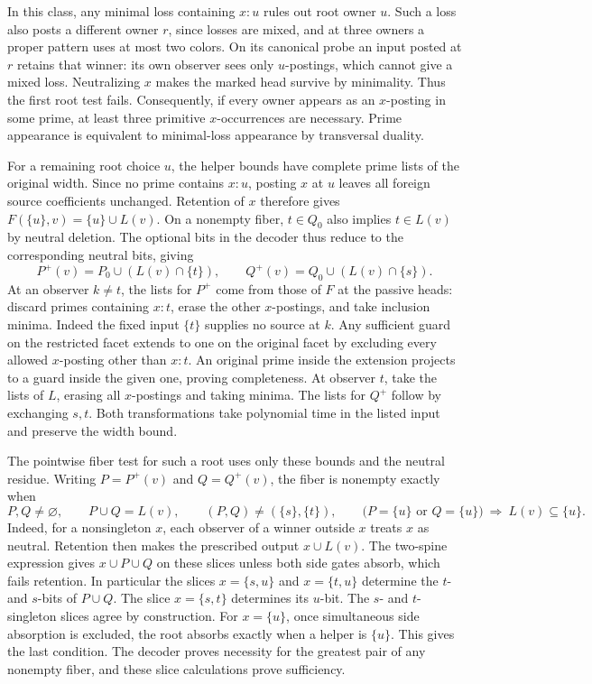 In this class, any minimal loss containing
$x:u$ rules out root owner $u$. Such a loss also
posts a different owner $r$, since losses are
mixed, and at three owners a proper pattern
uses at most two colors. On its canonical probe
an input posted at $r$ retains that winner:
its own observer sees only $u$-postings, which
cannot give a mixed loss. Neutralizing $x$ makes
the marked head survive by minimality. Thus the
first root test fails. Consequently, if every
owner appears as an $x$-posting in some prime,
at least three primitive $x$-occurrences are
necessary. Prime appearance is equivalent to
minimal-loss appearance by transversal duality.

For a remaining root choice $u$, the helper bounds
have complete prime lists of the original width.
Since no prime contains $x:u$, posting $x$ at $u$
leaves all foreign source coefficients unchanged.
Retention of $x$ therefore gives
$F(\{u\},v)=\{u\}\cup L(v)$. On a nonempty fiber,
$t\in Q_0$ also implies $t\in L(v)$ by neutral
deletion. The optional bits in the decoder thus
reduce to the corresponding neutral bits, giving
\[
 P^+(v)=P_0\cup(L(v)\cap\{t\}),\qquad
 Q^+(v)=Q_0\cup(L(v)\cap\{s\}).
\]
At an observer $k\ne t$, the lists for $P^+$
come from those of $F$ at the passive heads:
discard primes containing $x:t$, erase the other
$x$-postings, and take inclusion minima. Indeed
the fixed input $\{t\}$ supplies no source at $k$.
Any sufficient guard on the restricted facet
extends to one on the original facet by excluding
every allowed $x$-posting other than $x:t$.
An original prime inside the extension projects
to a guard inside the given one, proving
completeness. At observer $t$, take the lists of
$L$, erasing all $x$-postings and taking minima.
The lists for $Q^+$ follow by exchanging $s,t$.
Both transformations take polynomial time in the
listed input and preserve the width bound.

The pointwise fiber test for such a root uses only
these bounds and the neutral residue. Writing
$P=P^+(v)$ and $Q=Q^+(v)$, the fiber is nonempty
exactly when
\[
 P,Q\ne\varnothing,\qquad P\cup Q=L(v),\qquad
 (P,Q)\ne(\{s\},\{t\}),\qquad
 \bigl(P=\{u\}\text{ or }Q=\{u\}\bigr)
 \ \Longrightarrow\ L(v)\subseteq\{u\}.
\]
Indeed, for a nonsingleton $x$, each observer of a
winner outside $x$ treats $x$ as neutral. Retention
then makes the prescribed output $x\cup L(v)$.
The two-spine expression gives $x\cup P\cup Q$
on these slices unless both side gates absorb,
which fails retention. In particular the slices
$x=\{s,u\}$ and $x=\{t,u\}$ determine the $t$-
and $s$-bits of $P\cup Q$. The slice $x=\{s,t\}$
determines its $u$-bit. The $s$- and $t$-singleton
slices agree by construction. For $x=\{u\}$,
once simultaneous side absorption is excluded,
the root absorbs exactly when a helper is $\{u\}$.
This gives the last condition. The decoder proves
necessity for the greatest pair of any nonempty
fiber, and these slice calculations prove sufficiency.

